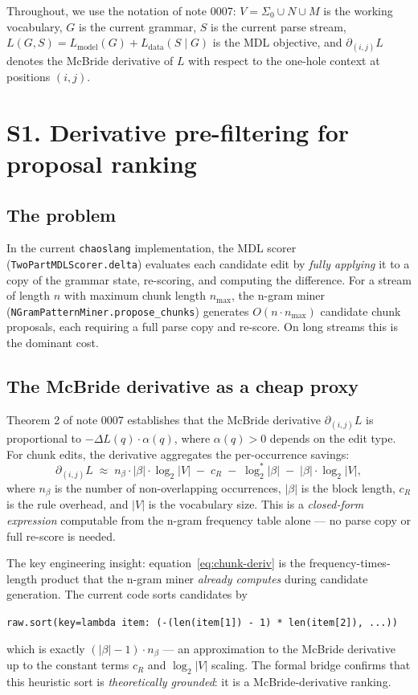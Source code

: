 \documentclass[11pt]{article}
\begin{document}
Throughout, we use the notation of note 0007: $V = \Sigma_0 \cup N \cup M$ is the working vocabulary, $G$ is the current grammar, $S$ is the current parse stream, $L(G, S) = L_{\text{model}}(G) + L_{\text{data}}(S \mid G)$ is the MDL objective, and $\partial_{(i,j)} L$ denotes the McBride derivative of $L$ with respect to the one-hole context at positions $(i, j)$.

\section{S1. Derivative pre-filtering for proposal ranking}

\subsection{The problem}

In the current \texttt{chaoslang} implementation, the MDL scorer (\texttt{TwoPartMDLScorer.delta}) evaluates each candidate edit by \emph{fully applying} it to a copy of the grammar state, re-scoring, and computing the difference.  For a stream of length $n$ with maximum chunk length $n_{\max}$, the n-gram miner (\texttt{NGramPatternMiner.propose\_chunks}) generates $O(n \cdot n_{\max})$ candidate chunk proposals, each requiring a full parse copy and re-score.  On long streams this is the dominant cost.

\subsection{The McBride derivative as a cheap proxy}

Theorem 2 of note 0007 establishes that the McBride derivative $\partial_{(i,j)} L$ is proportional to $-\Delta L(q) \cdot \alpha(q)$, where $\alpha(q) > 0$ depends on the edit type.  For chunk edits, the derivative aggregates the per-occurrence savings:
\begin{equation}
  \partial_{(i,j)} L \;\approx\; n_\beta \cdot |\beta| \cdot \log_2 |V| \;-\; c_R \;-\; \log_2^* |\beta| \;-\; |\beta| \cdot \log_2 |V|,
  \label{eq:chunk-deriv}
\end{equation}
where $n_\beta$ is the number of non-overlapping occurrences, $|\beta|$ is the block length, $c_R$ is the rule overhead, and $|V|$ is the vocabulary size.  This is a \emph{closed-form expression} computable from the n-gram frequency table alone --- no parse copy or full re-score is needed.

The key engineering insight: equation~\eqref{eq:chunk-deriv} is the frequency-times-length product that the n-gram miner \emph{already computes} during candidate generation.  The current code sorts candidates by
\begin{center}
\texttt{raw.sort(key=lambda item: (-(len(item[1]) - 1) * len(item[2]), ...))}
\end{center}
which is exactly $(|\beta| - 1) \cdot n_\beta$ --- an approximation to the McBride derivative up to the constant terms $c_R$ and $\log_2 |V|$ scaling.  The formal bridge confirms that this heuristic sort is \emph{theoretically grounded}: it is a McBride-derivative ranking.
\end{document}
